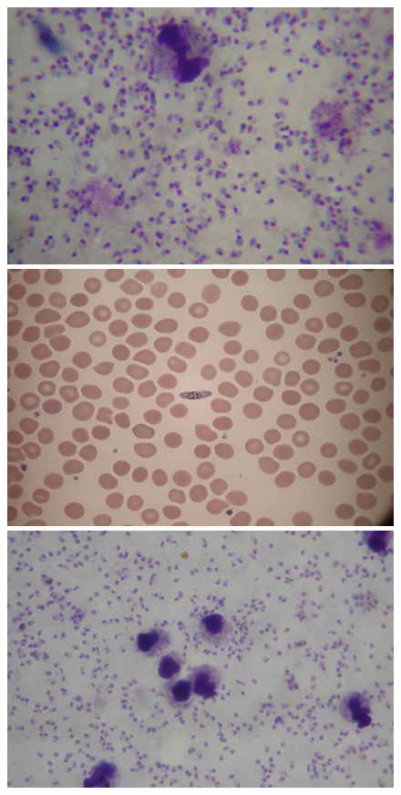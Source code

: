 \documentclass[sensors,review,accept,moreauthors,pdftex,10pt,a4paper]{mdpi}
\begin{document}
\begin{figure}[H]
	\centering
	\includegraphics[height=0.17\textheight]{img/f3_ThickGiemsa}
	\includegraphics[height=0.17\textheight]{img/f3_ThinGiemsa}
	\includegraphics[height=0.17\textheight]{img/f3_ThickLeishman}

\end{figure}
\end{document}
